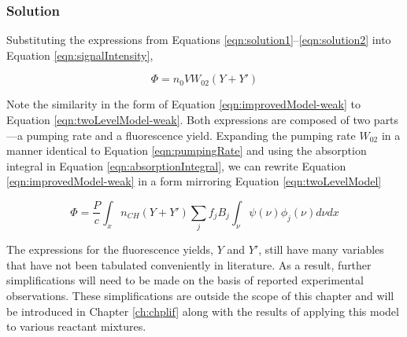 \subsubsection{Solution}
\label{subsubsec:improved-model-solution}

Substituting the expressions from Equations \ref{eqn:solution1}--\ref{eqn:solution2} into Equation \ref{eqn:signalIntensity},

\begin{equation}
  \Phi = n_0VW_{02}(Y + Y')
  \label{eqn:improvedModel-weak}
\end{equation}

Note the similarity in the form of Equation \ref{eqn:improvedModel-weak} to Equation \ref{eqn:twoLevelModel-weak}.
Both expressions are composed of two parts---a pumping rate and a fluorescence yield.
Expanding the pumping rate \(W_{02}\) in a manner identical to Equation \ref{eqn:pumpingRate} and using the absorption integral in Equation \ref{eqn:absorptionIntegral}, we can rewrite Equation \ref{eqn:improvedModel-weak} in a form mirroring Equation \ref{eqn:twoLevelModel}

\begin{equation}
  \Phi = \frac{P}{c} \int_x n_{CH} (Y + Y') \sum_j f_j B_j \int_\nu \psi(\nu) \phi_j(\nu) d\nu dx
  \label{eqn:improvedModel}
\end{equation}

The expressions for the fluorescence yields, \(Y\) and \(Y'\), still have many variables that have not been tabulated conveniently in literature.
As a result, further simplifications will need to be made on the basis of reported experimental observations.
These simplifications are outside the scope of this chapter and will be introduced in Chapter \ref{ch:chplif} along with the results of applying this model to various reactant mixtures.

